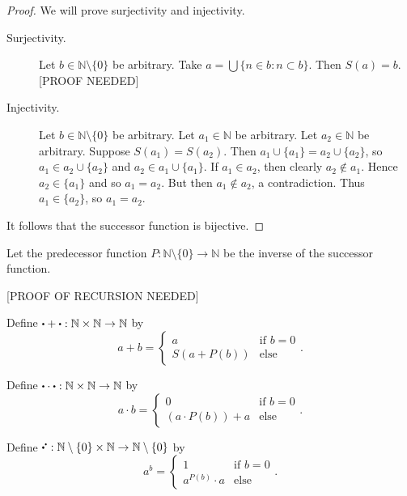 \documentclass[../../main.tex]{subfiles}
\begin{document}
\begin{proof}
    We will prove surjectivity and injectivity.
    \begin{description}
        \item[Surjectivity.]
        Let $b\in\mathbb{N}\setminus\{0\}$ be arbitrary. Take $a=\bigcup\{n\in b:n\subset b\}$. Then $S(a)=b$. [PROOF NEEDED]
        \item[Injectivity.]
        Let $b\in\mathbb{N}\setminus\{0\}$ be arbitrary. Let $a_1\in\mathbb{N}$ be arbitrary. Let $a_2\in\mathbb{N}$ be arbitrary. Suppose $S(a_1)=S(a_2)$. Then $a_1\cup\{a_1\}=a_2\cup\{a_2\}$, so $a_1\in a_2\cup\{a_2\}$ and $a_2\in a_1\cup\{a_1\}$. If $a_1\in a_2$, then clearly $a_2\notin a_1$. Hence $a_2\in\{a_1\}$ and so $a_1=a_2$. But then $a_1\notin a_2$, a contradiction. Thus $a_1\in\{a_2\}$, so $a_1=a_2$.
    \end{description}
    It follows that the successor function is bijective.
\end{proof}
\begin{definition}[Predecession]
    Let the predecessor function $P:\mathbb{N}\setminus\{0\}\to\mathbb{N}$ be the inverse of the successor function.
\end{definition}
[PROOF OF RECURSION NEEDED]
\begin{definition}[Addition]
    Define $\placeholder+\placeholder:\mathbb{N}\times\mathbb{N}\to\mathbb{N}$ by
    \begin{equation*}
        a+b=
        \begin{cases}
            a & \text{if }b=0 \\
            S(a+P(b)) & \text{else}
        \end{cases}.
    \end{equation*}
\end{definition}
\begin{definition}[Multiplication]
    Define $\placeholder\cdot\placeholder:\mathbb{N}\times\mathbb{N}\to\mathbb{N}$ by
    \begin{equation*}
        a\cdot b=
        \begin{cases}
            0 & \text{if }b=0 \\
            (a\cdot P(b))+a & \text{else}
        \end{cases}.
    \end{equation*}
\end{definition}
\begin{definition}[Exponentiation]
    Define $\placeholder^{\placeholder}:\mathbb{N}\setminus\{0\}\times\mathbb{N}\to\mathbb{N}\setminus\{0\}$ by
    \begin{equation*}
        a^b=
        \begin{cases}
            1 & \text{if }b=0 \\
            a^{P(b)}\cdot a & \text{else}
        \end{cases}.
    \end{equation*}
\end{definition}
\end{document}
